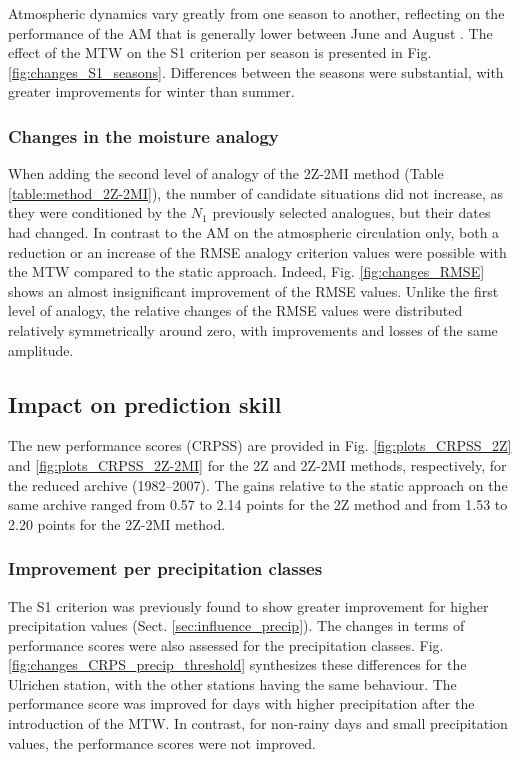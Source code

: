 \documentclass[hess, manuscript]{copernicus}
\begin{document}
	Atmospheric dynamics vary greatly from one season to another, reflecting on the performance of the AM that is generally lower between June and August \citep{Bliefernicht2010}. The effect of the MTW on the S1 criterion per season is presented in Fig. \ref{fig:changes_S1_seasons}. Differences between the seasons were substantial, with greater improvements for winter than summer. 
	
	
	\subsubsection{Changes in the moisture analogy}
	\label{sec:perf_2Z-2MI}
	
	When adding the second level of analogy of the 2Z-2MI method (Table \ref{table:method_2Z-2MI}), the number of candidate situations did not increase, as they were conditioned by the $N_{1}$ previously selected analogues, but their dates had changed. In contrast to the AM on the atmospheric circulation only, both a reduction or an increase of the RMSE analogy criterion values were possible with the MTW compared to the static approach. Indeed, Fig. \ref{fig:changes_RMSE} shows an almost insignificant improvement of the RMSE values. Unlike the first level of analogy, the relative changes of the RMSE values were distributed relatively symmetrically around zero, with improvements and losses of the same amplitude.
	
	
	\subsection{Impact on prediction skill}
	\label{sec:influence_scores}
	
	The new performance scores (CRPSS) are provided in Fig. \ref{fig:plots_CRPSS_2Z} and \ref{fig:plots_CRPSS_2Z-2MI} for the 2Z and 2Z-2MI methods, respectively, for the reduced archive (1982--2007). The gains relative to the static approach on the same archive ranged from 0.57 to 2.14 points for the 2Z method and from 1.53 to 2.20 points for the 2Z-2MI method. 
	
	
	\subsubsection{Improvement per precipitation classes}
	\label{sec:improvement_CRPSS_precip_threshold}
	
	The S1 criterion was previously found to show greater improvement for higher precipitation values (Sect. \ref{sec:influence_precip}). The changes in terms of performance scores were also assessed for the precipitation classes. Fig. \ref{fig:changes_CRPS_precip_threshold} synthesizes these differences for the Ulrichen station, with the other stations having the same behaviour. The performance score was improved for days with higher precipitation after the introduction of the MTW. In contrast, for non-rainy days and small precipitation values, the performance scores were not improved.
	
\end{document}

